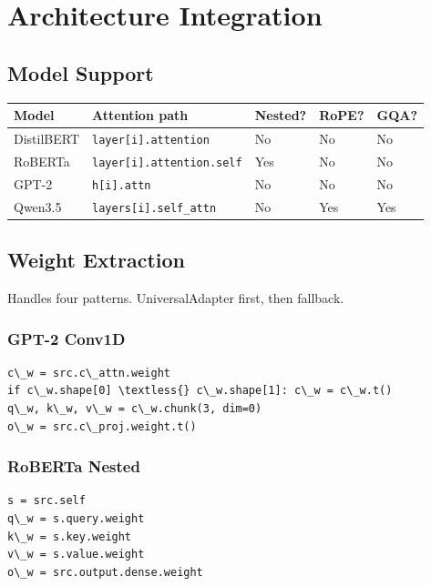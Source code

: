 \section{Architecture Integration}

\subsection{Model Support}

\begin{table}[H]
\centering
\small
\begin{tabular}{lllll}
\toprule
\textbf{Model} & \textbf{Attention path} & \textbf{Nested?} & \textbf{RoPE?} & \textbf{GQA?} \\
\midrule
DistilBERT & \texttt{layer[i].attention} & No & No & No \\
RoBERTa & \texttt{layer[i].attention.self} & Yes & No & No \\
GPT-2 & \texttt{h[i].attn} & No & No & No \\
Qwen3.5 & \texttt{layers[i].self\_attn} & No & Yes & Yes \\
\bottomrule
\end{tabular}
\end{table}

\subsection{Weight Extraction}

Handles four patterns. UniversalAdapter first, then fallback.

\subsubsection{GPT-2 Conv1D}

\begin{lstlisting}
c\_w = src.c\_attn.weight
if c\_w.shape[0] \textless{} c\_w.shape[1]: c\_w = c\_w.t()
q\_w, k\_w, v\_w = c\_w.chunk(3, dim=0)
o\_w = src.c\_proj.weight.t()
\end{lstlisting}

\subsubsection{RoBERTa Nested}

\begin{lstlisting}
s = src.self
q\_w = s.query.weight
k\_w = s.key.weight
v\_w = s.value.weight
o\_w = src.output.dense.weight
\end{lstlisting}

